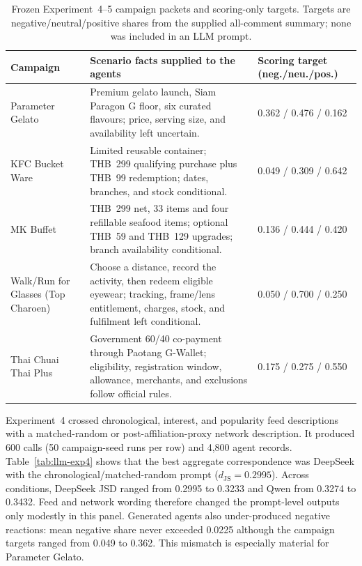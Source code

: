\documentclass[conference]{IEEEtran}
\begin{document}
\begin{table}[t]
\caption{Frozen Experiment~4--5 campaign packets and scoring-only targets.
Targets are negative/neutral/positive shares from the supplied all-comment
summary; none was included in an LLM prompt.}
\label{tab:llm-exp45-scenarios}
\centering
\scriptsize
\begin{tabular}{@{}p{}p{}p{}@{}}
\toprule
Campaign & Scenario facts supplied to the agents & Scoring target (neg./neu./pos.) \\
\midrule
Parameter Gelato & Premium gelato launch, Siam Paragon G floor, six curated
flavours; price, serving size, and availability left uncertain. & 0.362 / 0.476 / 0.162 \\
KFC Bucket Ware & Limited reusable container; THB~299 qualifying purchase plus
THB~99 redemption; dates, branches, and stock conditional. & 0.049 / 0.309 / 0.642 \\
MK Buffet & THB~299 net, 33 items and four refillable seafood items; optional
THB~59 and THB~129 upgrades; branch availability conditional. & 0.136 / 0.444 / 0.420 \\
Walk/Run for Glasses (Top Charoen) & Choose a distance, record the activity,
then redeem eligible eyewear; tracking, frame/lens entitlement, charges, stock,
and fulfilment left conditional. & 0.050 / 0.700 / 0.250 \\
Thai Chuai Thai Plus & Government 60/40 co-payment through Paotang G-Wallet;
eligibility, registration window, allowance, merchants, and exclusions follow
official rules. & 0.175 / 0.275 / 0.550 \\
\bottomrule
\end{tabular}
\end{table}

Experiment~4 crossed chronological, interest, and popularity feed descriptions
with a matched-random or post-affiliation-proxy network description. It
produced 600 calls (50 campaign-seed runs per row) and 4,800 agent records.
Table~\ref{tab:llm-exp4} shows that the best aggregate correspondence was
DeepSeek with the chronological/matched-random prompt
($d_{\mathrm{JS}}=0.2995$). Across conditions, DeepSeek JSD ranged from 0.2995
to 0.3233 and Qwen from 0.3274 to 0.3432. Feed and network wording therefore
changed the prompt-level outputs only modestly in this panel. Generated agents
also under-produced negative reactions: mean negative share never exceeded
0.0225 although the campaign targets ranged from 0.049 to 0.362. This mismatch
is especially material for Parameter Gelato.
\end{document}
